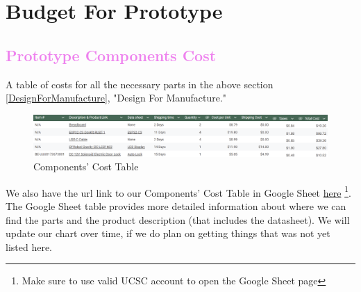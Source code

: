 \section{Budget For Prototype}

\textcolor{violet}{\subsection{Prototype Components Cost}}

A table of costs for all the necessary parts in the above section \ref{DesignForManufacture}, "Design For Manufacture."

\begin{figure}[!htbp]
    \centering
    \includegraphics[width=1\linewidth]{./img/Budget_Table.png}
    \caption{Components' Cost Table}
    \label{fig:ComponentsCostFig}
\end{figure}

We also have the url link to our Components' Cost Table in Google Sheet \href{https://docs.google.com/spreadsheets/d/1MM1I6pMeTvkLUvmaVntZBH55sUJj1Fe8FqNDRRbwthA/edit?usp=sharing}{here} \footnote{Make sure to use valid UCSC account to open the Google Sheet page}. The Google Sheet table provides more detailed information about where we can find the parts and the product description (that includes the datasheet). We will update our chart over time, if we do plan on getting things that was not yet listed here.
